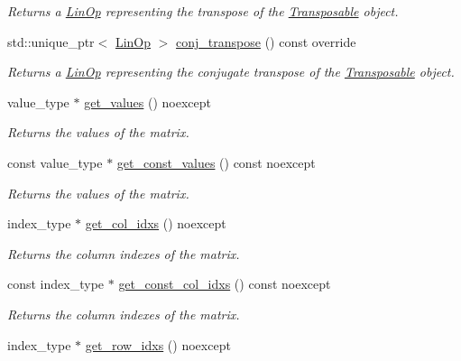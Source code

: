 \begin{DoxyCompactItemize}
\begin{DoxyCompactList}\small\item\em Returns a \hyperlink{classgko_1_1LinOp}{Lin\+Op} representing the transpose of the \hyperlink{classgko_1_1Transposable}{Transposable} object. \end{DoxyCompactList}\item 
std\+::unique\+\_\+ptr$<$ \hyperlink{classgko_1_1LinOp}{Lin\+Op} $>$ \hyperlink{classgko_1_1matrix_1_1Coo_ac1d91c524ca616b4c9e5f2a62f3f55ce}{conj\+\_\+transpose} () const override
\begin{DoxyCompactList}\small\item\em Returns a \hyperlink{classgko_1_1LinOp}{Lin\+Op} representing the conjugate transpose of the \hyperlink{classgko_1_1Transposable}{Transposable} object. \end{DoxyCompactList}\item 
value\+\_\+type $\ast$ \hyperlink{classgko_1_1matrix_1_1Coo_a1ce59517b8d6a8eeaacfed2b19d4057a}{get\+\_\+values} () noexcept
\begin{DoxyCompactList}\small\item\em Returns the values of the matrix. \end{DoxyCompactList}\item 
const value\+\_\+type $\ast$ \hyperlink{classgko_1_1matrix_1_1Coo_af0f6fe19d81bc4207aad66376f9c87c5}{get\+\_\+const\+\_\+values} () const noexcept
\begin{DoxyCompactList}\small\item\em Returns the values of the matrix. \end{DoxyCompactList}\item 
index\+\_\+type $\ast$ \hyperlink{classgko_1_1matrix_1_1Coo_a1b619cf23c7c87cb4109432c8e8db66d}{get\+\_\+col\+\_\+idxs} () noexcept
\begin{DoxyCompactList}\small\item\em Returns the column indexes of the matrix. \end{DoxyCompactList}\item 
const index\+\_\+type $\ast$ \hyperlink{classgko_1_1matrix_1_1Coo_ae4afdbf2dc5a5a42a197f3a479febc75}{get\+\_\+const\+\_\+col\+\_\+idxs} () const noexcept
\begin{DoxyCompactList}\small\item\em Returns the column indexes of the matrix. \end{DoxyCompactList}\item 
index\+\_\+type $\ast$ \hyperlink{classgko_1_1matrix_1_1Coo_a57aa0f7b701020c4322a3aed63d8a25d}{get\+\_\+row\+\_\+idxs} () noexcept

\end{DoxyCompactItemize}

